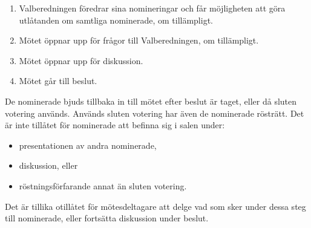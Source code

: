 \documentclass[11pt, includeaddress]{classes/cthit}
\begin{document}
\begin{enumerate}
    \item Valberedningen föredrar sina nomineringar och får möjligheten att göra utlåtanden om samtliga nominerade, om tillämpligt.
    \item Mötet öppnar upp för frågor till Valberedningen, om tillämpligt.
    \item Mötet öppnar upp för diskussion.
    \item Mötet går till beslut.
\end{enumerate}
De nominerade bjuds tillbaka in till mötet efter beslut är taget, eller då sluten votering används. Används sluten votering har även de nominerade rösträtt. Det är inte tillåtet för nominerade att befinna sig i salen under:
\begin{itemize}
    \item presentationen av andra nominerade,
    \item diskussion, eller
    \item röstningsförfarande annat än sluten votering.
\end{itemize}
Det är tillika otillåtet för mötesdeltagare att delge vad som sker under dessa steg till nominerade, eller fortsätta diskussion under beslut.
\end{document}
